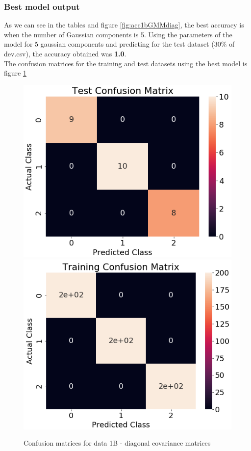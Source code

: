 \documentclass[11pt,a4paper]{article}
\begin{document}
\subsubsection{Best model output}
As we can see in the tables and figure \ref{fig:acc1bGMMdiag}, the best accuracy is when the number of Gaussian components is 5. Using the parameters of the model for 5 gaussian components and predicting for the test dataset (30\% of dev.csv), the accuracy obtained was \textbf{1.0}.\\
The confusion matrices for the training and test datasets using the best model is figure \ref{fig:conf_1b_diag}\\
\begin{figure}[H]
    \includegraphics[scale = 0.5]{images/conf_test1b.png}
    \includegraphics[scale = 0.5]{images/conf_train1b.png}
    \caption{Confusion matrices for data 1B - diagonal covariance matrices}
    \label{fig:conf_1b_diag}
\end{figure}
\end{document}
